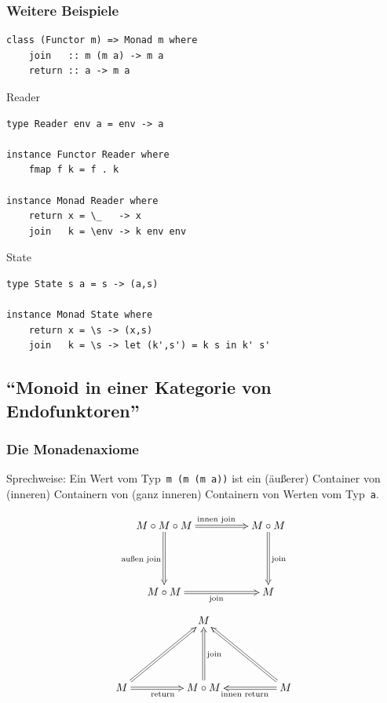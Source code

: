 \documentclass[12pt,compress,ngerman,utf8,t]{beamer}
\begin{document}
\begin{frame}[fragile]\frametitle{Weitere Beispiele}
  \vspace*{-1em}
  \begin{verbatim}
class (Functor m) => Monad m where
    join   :: m (m a) -> m a
    return :: a -> m a
  \end{verbatim}

  \begin{block}{Reader}
    \scriptsize
    \begin{verbatim}
type Reader env a = env -> a

instance Functor Reader where
    fmap f k = f . k

instance Monad Reader where
    return x = \_   -> x
    join   k = \env -> k env env
    \end{verbatim}
  \end{block}

  \begin{block}{State}
    \scriptsize
    \begin{verbatim}
type State s a = s -> (a,s)

instance Monad State where
    return x = \s -> (x,s)
    join   k = \s -> let (k',s') = k s in k' s'
    \end{verbatim}
  \end{block}
\end{frame}



\subsection{"`Monoid in einer Kategorie von Endofunktoren"'}

\begin{frame}\frametitle{Die Monadenaxiome}
  {\scriptsize
  Sprechweise: Ein Wert vom Typ~\texttt{m (m (m a))} ist ein (äußerer) Container von
  (inneren) Containern von (ganz inneren) Containern von Werten vom
  Typ~\texttt{a}.\par}

  \[ \xymatrixcolsep{4pc}\xymatrixrowsep{4pc}\xymatrix{
    M \circ M \circ M \ar@{=>}[r]^{\text{innen join}} \ar@{=>}[d]_{\text{außen join}} & M \circ M
    \ar@{=>}[d]^{\text{join}} \\
    M \circ M \ar@{=>}[r]_{\text{join}} & M
  } \]
  \medskip
  \[ \xymatrixcolsep{4pc}\xymatrixrowsep{4pc}\xymatrix{
    & M \\
    M \ar@{=>}[r]_{\text{return}}\ar@{=>}[ru] & M \circ M \ar@{=>}[u]_{\text{join}} & \ar@{=>}[l]^{\text{innen
    return}}\ar@{=>}[lu] M
  } \]
\end{frame}
\end{document}
